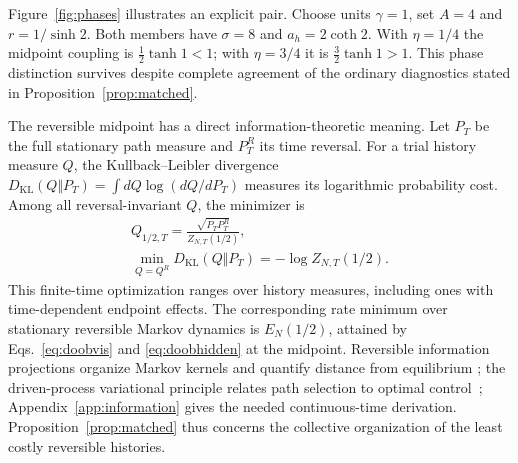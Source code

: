 \documentclass[aps,pre,reprint,amsmath,amssymb,longbibliography,floatfix]{revtex4-2}
\newcommand{\KL}{D_{\mathrm{KL}}}
\begin{document}
Figure~\ref{fig:phases} illustrates an explicit pair. Choose units $\gamma=1$, set $A=4$ and
$r=1/\sinh2$. Both members have $\sigma=8$ and $a_h=2\coth2$.
With $\eta=1/4$ the midpoint coupling is $\tfrac12\tanh1<1$;
with $\eta=3/4$ it is $\tfrac32\tanh1>1$.
This phase distinction survives despite complete agreement of the
ordinary diagnostics stated in Proposition~\ref{prop:matched}.

The reversible midpoint has a direct information-theoretic meaning.
Let $P_T$ be the full stationary path measure and $P_T^R$ its time
reversal. For a trial history measure $Q$, the Kullback--Leibler divergence
$\KL(Q\Vert P_T)=\int dQ\log(dQ/dP_T)$ measures its logarithmic
probability cost. Among all reversal-invariant $Q$, the minimizer is
\begin{equation}
 \begin{gathered}
 Q_{1/2,T}=\frac{\sqrt{P_T P_T^R}}{Z_{N,T}(1/2)},\\
 \min_{Q=Q^R}\KL(Q\Vert P_T)=-\log Z_{N,T}(1/2).
 \end{gathered}
 \label{eq:KLprojection}
\end{equation}
This finite-time optimization ranges over history measures, including
ones with time-dependent endpoint effects. The corresponding rate minimum over
stationary reversible Markov dynamics is $E_N(1/2)$, attained by
Eqs.~\eqref{eq:doobvis} and \eqref{eq:doobhidden} at the midpoint.
Reversible information projections organize Markov kernels
\cite{WolferWatanabe2021} and quantify distance from equilibrium
\cite{Andrieux2025}; the driven-process variational principle relates
path selection to optimal control~\cite{ChetriteTouchetteControl2015};
Appendix~\ref{app:information} gives the needed continuous-time derivation.
Proposition~\ref{prop:matched} thus concerns the collective organization
of the least costly reversible histories.
\end{document}
